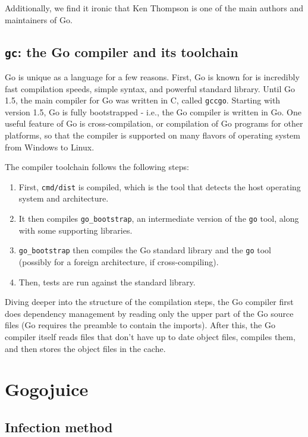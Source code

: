 \documentclass[10pt]{sigplanconf}
\begin{document}
Additionally, we find it ironic that Ken Thompson is one of the main authors and maintainers of Go.

\subsection{\texttt{gc}: the Go compiler and its toolchain}
Go is unique as a language for a few reasons. First, Go is known for is incredibly fast compilation speeds, simple syntax, and powerful standard library. Until Go 1.5, the main compiler for Go was written in C, called \texttt{gccgo}. Starting with version 1.5, Go is fully bootstrapped - i.e., the Go compiler is written in Go. One useful feature of Go is cross-compilation, or compilation of Go programs for other platforms, so that the compiler is supported on many flavors of operating system from Windows to Linux.

\smallskip
The compiler toolchain follows the following steps: 
\begin{enumerate}
	\item First, \texttt{cmd/dist} is compiled, which is the tool that detects the host operating system and architecture.
	\item It then compiles \texttt{go\_bootstrap}, an intermediate version of the \texttt{go} tool, along with some supporting libraries.
	\item \texttt{go\_bootstrap} then compiles the Go standard library and the \texttt{go} tool (possibly for a foreign architecture, if cross-compiling). 
	\item Then, tests are run against the standard library.  
\end{enumerate}

Diving deeper into the structure of the compilation steps, the Go compiler first does dependency management by reading only the upper part of the Go source files (Go requires the preamble to contain the imports). After this, the Go compiler itself reads files that don't have up to date object files, compiles them, and then stores the object files in the cache. 

\section{Gogojuice}

\subsection{Infection method}
\end{document}

